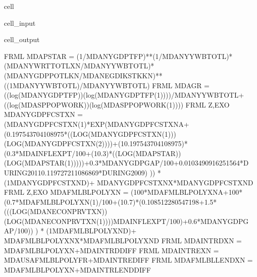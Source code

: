 \documentclass[letterpaper,10pt,english]{jupyterBook}
\begin{document}
\begin{sphinxuseclass}{cell}\begin{sphinxVerbatimInput}

\begin{sphinxuseclass}{cell_input}
\begin{sphinxVerbatim}[commandchars=\\\{\}]
\end{sphinxVerbatim}

\end{sphinxuseclass}\end{sphinxVerbatimInput}
\begin{sphinxVerbatimOutput}

\begin{sphinxuseclass}{cell_output}
\begin{sphinxVerbatim}[commandchars=\\\{\}]
FRML  \PYGZlt{}\PYGZgt{} MDAPSTAR = (1/MDANYGDPTFP)**(1/MDANYYWBTOTL\PYGZus{})*(MDANYWRTTOTLXN/MDANYYWBTOTL\PYGZus{})*(MDANYGDPPOTLKN/MDANEGDIKSTKKN)**((1\PYGZhy{}MDANYYWBTOTL\PYGZus{})/MDANYYWBTOTL\PYGZus{}) \PYGZdl{}
FRML  \PYGZlt{}\PYGZgt{} MDAGR = ((log(MDANYGDPTFP))\PYGZhy{}(log(MDANYGDPTFP(\PYGZhy{}1))))/MDANYYWBTOTL\PYGZus{}+((log(MDASPPOPWORK))\PYGZhy{}(log(MDASPPOPWORK(\PYGZhy{}1)))) \PYGZdl{}
FRML \PYGZlt{}Z,EXO\PYGZgt{} MDANYGDPFCSTXN = (MDANYGDPFCSTXN(\PYGZhy{}1)*EXP(MDANYGDPFCSTXN\PYGZus{}A+ (0.197543704108975*((LOG(MDANYGDPFCSTXN(\PYGZhy{}1)))\PYGZhy{}(LOG(MDANYGDPFCSTXN(\PYGZhy{}2))))+(1\PYGZhy{}0.197543704108975)*(0.3*MDAINFLEXPT/100+(1\PYGZhy{}0.3)*((LOG(MDAPSTAR))\PYGZhy{}(LOG(MDAPSTAR(\PYGZhy{}1)))))+0.3*MDANYGDPGAP\PYGZus{}/100+0.0103490916251564*DURING\PYGZus{}2011\PYGZhy{}0.119727211086869*DURING\PYGZus{}2009) )) * (1\PYGZhy{}MDANYGDPFCSTXN\PYGZus{}D)+ MDANYGDPFCSTXN\PYGZus{}X*MDANYGDPFCSTXN\PYGZus{}D  \PYGZdl{}
FRML \PYGZlt{}Z,EXO\PYGZgt{} MDAFMLBLPOLYXN = (100*MDAFMLBLPOLYXN\PYGZus{}A+100* (0.7*MDAFMLBLPOLYXN(\PYGZhy{}1)/100+(1\PYGZhy{}0.7)*(0.108512280547198+1.5*(((LOG(MDANECONPRVTXN))\PYGZhy{}(LOG(MDANECONPRVTXN(\PYGZhy{}1))))\PYGZhy{}MDAINFLEXPT/100)+0.6*MDANYGDPGAP\PYGZus{}/100)) ) * (1\PYGZhy{}MDAFMLBLPOLYXN\PYGZus{}D)+ MDAFMLBLPOLYXN\PYGZus{}X*MDAFMLBLPOLYXN\PYGZus{}D  \PYGZdl{}
FRML  \PYGZlt{}\PYGZgt{} MDAINTRDXN = MDAFMLBLPOLYXN+MDAINTRDDIFF \PYGZdl{}
FRML  \PYGZlt{}\PYGZgt{} MDAINTREXN = MDAUSAFMLBLPOLYFR+MDAINTREDIFF \PYGZdl{}
FRML  \PYGZlt{}\PYGZgt{} MDAFMLBLLENDXN = MDAFMLBLPOLYXN+MDAINTRLENDDIFF \PYGZdl{}

\end{sphinxVerbatim}
\end{sphinxuseclass}
\end{sphinxVerbatimOutput}
\end{sphinxuseclass}
\end{document}
